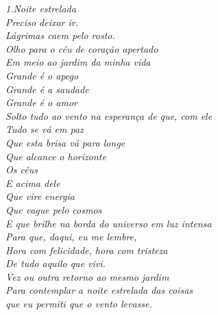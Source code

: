 \clearpage
\thispagestyle{empty}

\vspace*{\fill}

\begin{flushright}
    \itshape
    1.Noite estrelada \\[0.5cm]

    Preciso deixar ir. \\
    Lágrimas caem pelo rosto.\\
    Olho para o céu de coração apertado\\
    Em meio ao jardim da minha vida \\
    Grande é o apego \\
    Grande é a saudade\\
    Grande é o amor\\
    Solto tudo ao vento na esperança de que, com ele\\
    Tudo se vá em paz \\[\baselineskip]
    Que esta brisa vá para longe\\
    Que alcance o horizonte \\
    Os céus \\
    E acima dele\\
    Que vire energia\\
    Que vague pelo cosmos \\
    E que brilhe na borda do universo em luz intensa\\
    Para que, daqui, eu me lembre,\\
    Hora com felicidade, hora com tristeza\\
    De tudo aquilo que vivi. \\[\baselineskip]
    Vez ou outra retorno ao mesmo jardim\\
    Para contemplar a noite estrelada das coisas \\
    que eu permiti que o vento levasse.\\

\end{flushright}

\clearpage
